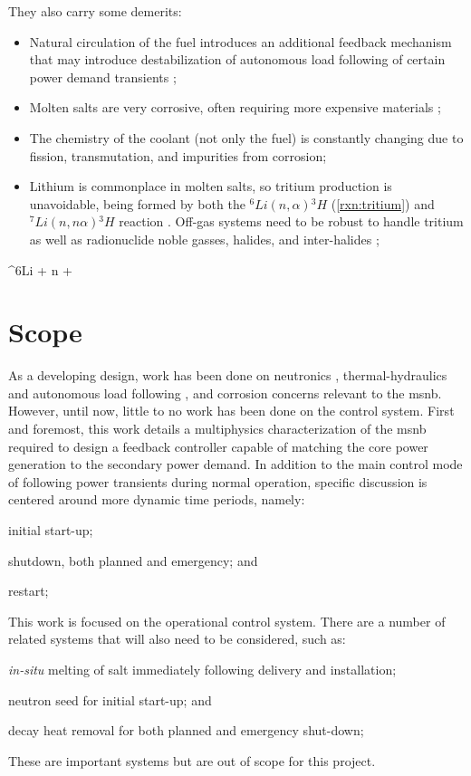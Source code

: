 They also carry some demerits:
\begin{itemize}
    \item Natural circulation of the fuel introduces an additional feedback mechanism that may introduce destabilization of autonomous load following of certain power demand transients \cite{CarterNumerical};
    \item Molten salts are very corrosive, often requiring more expensive materials \cite{RoperRedox};
    \item The chemistry of the coolant (not only the fuel) is constantly changing due to fission, transmutation, and impurities from corrosion;
    \item Lithium is commonplace in molten salts, so tritium production is unavoidable, being formed by both the $^{6}Li(n,\alpha){^{3}H}$ (\ref{rxn:tritium}) and $^{7}Li(n,n\alpha){^{3}H}$ reaction . Off-gas systems need to be robust to handle tritium as well as radionuclide noble gasses, halides, and inter-halides \cite{HolcombOffgas};
\end{itemize}

\begin{reaction} \label{rxn:tritium}
    ^{6}Li + n  + \alpha
\end{reaction}

\section{Scope}
As a developing design, work has been done on neutronics \cite{PetersonMS}, thermal-hydraulics and autonomous load following \cite{CarterPHD}, and corrosion concerns \cite{RoperPHD} relevant to the \acs{msnb}. However, until now, little to no work has been done on the control system. First and foremost, this work details a multiphysics characterization of the \acs{msnb} required to design a feedback controller capable of matching the core power generation to the secondary power demand. In addition to the main control mode of following power transients during normal operation, specific discussion is centered around more dynamic time periods, namely: 
\begin{enumerate*}
    \item initial start-up;
    \item shutdown, both planned and emergency; and
    \item restart;
\end{enumerate*}

This work is focused on the operational control system. There are a number of related systems that will also need to be considered, such as: 
\begin{enumerate*}
    \item \textit{in-situ} melting of salt immediately following delivery and installation;
    \item neutron seed for initial start-up; and
    \item decay heat removal for both planned and emergency shut-down;
\end{enumerate*}
These are important systems but are out of scope for this project.


